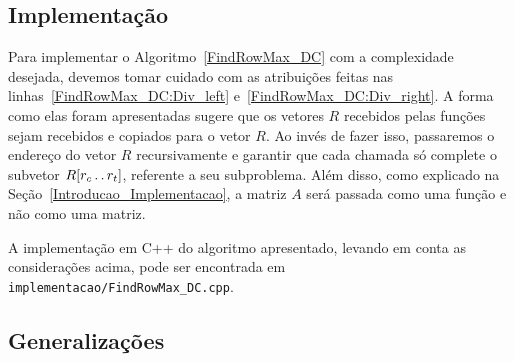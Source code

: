 \subsection{Implementação} \label{DivisaoEConquista_Implementacao}
Para implementar o Algoritmo~\ref{FindRowMax_DC} com a complexidade desejada, devemos tomar cuidado com as atribuições feitas nas linhas~\ref{FindRowMax_DC:Div_left} e~\ref{FindRowMax_DC:Div_right}. A forma como elas foram apresentadas sugere que os vetores $R$ recebidos pelas funções sejam recebidos e copiados para o vetor $R$. Ao invés de fazer isso, passaremos o endereço do vetor $R$ recursivamente e garantir que cada chamada só complete o subvetor $R[r_c \,.\,.\, r_t]$, referente a seu subproblema. Além disso, como explicado na Seção~\ref{Introducao_Implementacao}, a matriz $A$ será passada como uma função e não como uma matriz.

A implementação em C++ do algoritmo apresentado, levando em conta as considerações acima, pode ser encontrada em \texttt{implementacao/FindRowMax\_DC.cpp}.

\subsection{Generalizações} \label{DivisaoEConquista_Generalizacoes}
